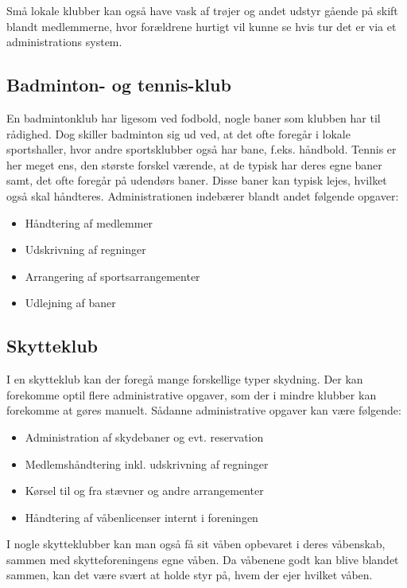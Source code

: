 Små lokale klubber kan også have vask af trøjer og andet udstyr gående på skift blandt medlemmerne, hvor forældrene
hurtigt vil kunne se hvis tur det er via et administrations system.

\subsection{Badminton- og tennis-klub}

En badmintonklub har ligesom ved fodbold, nogle baner som klubben har til rådighed. Dog skiller badminton sig ud ved, at
det ofte foregår i lokale sportshaller, hvor andre sportsklubber også har bane, f.eks. håndbold. Tennis er her meget
ens, den største forskel værende, at de typisk har deres egne baner samt, det ofte foregår på udendørs baner. Disse baner kan
typisk lejes, hvilket også skal håndteres. Administrationen indebærer blandt andet følgende opgaver:

\begin{itemize}
\item Håndtering af medlemmer
\item Udskrivning af regninger
\item Arrangering af sportsarrangementer
\item Udlejning af baner
\end{itemize}

\subsection{Skytteklub}

I en skytteklub kan der foregå mange forskellige typer skydning. Der kan forekomme
optil flere administrative opgaver, som der i mindre klubber kan forekomme at gøres manuelt. Sådanne administrative
opgaver kan være følgende:

\begin{itemize}
\item Administration af skydebaner og evt. reservation
\item Medlemshåndtering inkl. udskrivning af regninger
\item Kørsel til og fra stævner og andre arrangementer
\item Håndtering af våbenlicenser internt i foreningen
\end{itemize}

I nogle skytteklubber kan man også få sit våben opbevaret i deres våbenskab, sammen med skytteforeningens egne våben. Da
våbenene godt kan blive blandet sammen, kan det være svært at holde styr på, hvem der ejer hvilket våben.


